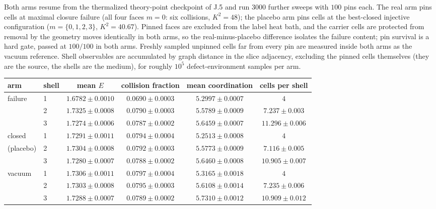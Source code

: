 \documentclass[11pt]{article}
\begin{document}
Both arms resume from the thermalized theory-point checkpoint of J.5 and run $3000$ further sweeps with $100$ pins each. The real arm pins cells at maximal closure failure (all four faces $m=0$: six collisions, $K^2=48$); the placebo arm pins cells at the best-closed injective configuration ($m=\{0,1,2,3\}$, $K^2=40.67$). Pinned faces are excluded from the label heat bath, and the carrier cells are protected from removal by the geometry moves identically in both arms, so the real-minus-placebo difference isolates the failure content; pin survival is a hard gate, passed at $100/100$ in both arms. Freshly sampled unpinned cells far from every pin are measured inside both arms as the vacuum reference. Shell observables are accumulated by graph distance in the slice adjacency, excluding the pinned cells themselves (they are the source, the shells are the medium), for roughly $10^5$ defect-environment samples per arm.

\begin{center}
{\small
\begin{tabular}{llcccc}
\hline
arm & shell & mean $E$ & collision fraction & mean coordination & cells per shell \\
\hline
failure   & 1 & $1.6782\pm0.0010$ & $0.0690\pm0.0003$ & $5.2997\pm0.0007$ & $4$ \\
          & 2 & $1.7325\pm0.0008$ & $0.0790\pm0.0003$ & $5.5789\pm0.0009$ & $7.237\pm0.003$ \\
          & 3 & $1.7274\pm0.0006$ & $0.0787\pm0.0002$ & $5.6459\pm0.0007$ & $11.296\pm0.006$ \\
\hline
closed    & 1 & $1.7291\pm0.0011$ & $0.0794\pm0.0004$ & $5.2513\pm0.0008$ & $4$ \\
(placebo) & 2 & $1.7304\pm0.0008$ & $0.0792\pm0.0003$ & $5.5773\pm0.0009$ & $7.116\pm0.005$ \\
          & 3 & $1.7280\pm0.0007$ & $0.0788\pm0.0002$ & $5.6460\pm0.0008$ & $10.905\pm0.007$ \\
\hline
vacuum    & 1 & $1.7306\pm0.0011$ & $0.0797\pm0.0004$ & $5.3165\pm0.0018$ & $4$ \\
          & 2 & $1.7303\pm0.0008$ & $0.0795\pm0.0003$ & $5.6108\pm0.0014$ & $7.235\pm0.006$ \\
          & 3 & $1.7288\pm0.0007$ & $0.0789\pm0.0002$ & $5.7310\pm0.0012$ & $10.909\pm0.012$ \\
\hline
\end{tabular}
}
\end{center}
\end{document}

